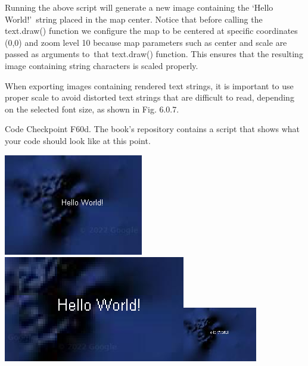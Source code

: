 \documentclass[
  letterpaper,
  DIV=11,
  numbers=noendperiod]{scrreprt}
\begin{document}
Running the above script will generate a new image containing the `Hello
World!'~string placed in the map center. Notice that before calling the
text.draw() function we configure the map to be centered at specific
coordinates (0,0) and zoom level 10 because map parameters such as
center and scale are passed as arguments to~that text.draw() function.
This ensures that the resulting image containing string characters is
scaled properly.

When exporting images containing rendered text strings, it is important
to use proper scale to avoid distorted text strings that are difficult
to read, depending on the selected font size, as shown in Fig. 6.0.7.

\begin{tcolorbox}[enhanced jigsaw, left=2mm, breakable, rightrule=.15mm, opacityback=0, colframe=quarto-callout-note-color-frame, colbacktitle=quarto-callout-note-color!10!white, arc=.35mm, opacitybacktitle=0.6, toptitle=1mm, colback=white, leftrule=.75mm, title=\textcolor{quarto-callout-note-color}{\faInfo}\hspace{0.5em}{Note}, toprule=.15mm, bottomtitle=1mm, titlerule=0mm, bottomrule=.15mm, coltitle=black]

Code Checkpoint F60d. The book's repository contains a script that shows
what your code should look like at this point.

\end{tcolorbox}

\includegraphics{./F6/image39.png}\includegraphics{./F6/image74.png}\includegraphics{./F6/image44.png}
\end{document}
